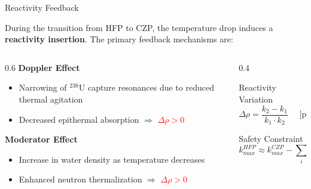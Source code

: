 \documentclass[aspectratio=169]{beamer}
\begin{document}
\begin{frame}{Reactivity Feedback}

    During the transition from HFP to CZP, the temperature drop induces a \textbf{reactivity insertion}. The primary feedback mechanisms are: \\
    \vspace{0.3cm}
    \begin{columns}[T]
        \begin{column}{0.6\textwidth}
            \textbf{Doppler Effect}
            \begin{itemize}
                \item Narrowing of $^{238}$U capture resonances due to reduced thermal agitation
                \item Decreased epithermal absorption $\Rightarrow$ \textcolor{red}{$\Delta\rho > 0$}
            \end{itemize}
            
            \vspace{0.5cm}
            
            \textbf{Moderator Effect}
            \begin{itemize}
                \item Increase in water density as temperature decreases
                \item Enhanced neutron thermalization $\Rightarrow$ \textcolor{red}{$\Delta\rho > 0$}
            \end{itemize}
        \end{column}
        
        \begin{column}{0.4\textwidth}
            \begin{alertblock}{Reactivity Variation}
                \begin{equation*}
                    \Delta\rho = \frac{k_2 - k_1}{k_1 \cdot k_2} \quad \text{ [pcm]}
                \end{equation*}
            \end{alertblock}
            
            \vspace{0.3cm}
            
            \begin{block}{Safety Constraint}
                \begin{equation*}
                    k_{max}^{HFP} \approx  k_{max}^{CZP} - \sum_i \Delta\rho_i
                \end{equation*}
            \end{block}
        \end{column}
    \end{columns}
\end{frame}
\end{document}
